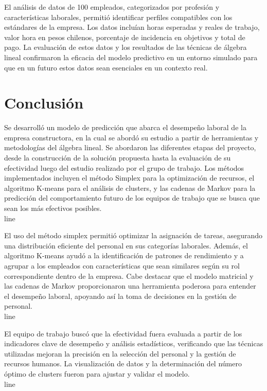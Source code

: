 \documentclass{plantillauft}
\begin{document}
El análisis de datos de 100 empleados, categorizados por profesión y características laborales, permitió identificar perfiles compatibles con los estándares de la empresa. Los datos incluían horas esperadas y reales de trabajo, valor hora en pesos chilenos, porcentaje de incidencia en objetivos y total de pago. La evaluación de estos datos y los resultados de las técnicas de álgebra lineal confirmaron la eficacia del modelo predictivo en un entorno simulado para que en un futuro estos datos sean esenciales en un contexto real.

\newpage

\section{Conclusión}
Se desarrolló un modelo de predicción que abarca el desempeño laboral de la empresa constructora, en la cual se abordó su estudio a partir de herramientas y metodologías del álgebra lineal. Se abordaron las diferentes etapas del proyecto, desde la construcción de la solución propuesta hasta la evaluación de su efectividad luego del estudio realizado por el grupo de trabajo. Los métodos implementados incluyen el método Simplex para la optimización de recursos, el algoritmo K-means para el análisis de clusters, y las cadenas de Markov para la predicción del comportamiento futuro de los equipos de trabajo que se busca que sean los más efectivos posibles.\\line

El uso del método simplex permitió optimizar la asignación de tareas, asegurando una distribución eficiente del personal en sus categorías laborales. Además, el algoritmo K-means ayudó a la identificación de patrones de rendimiento y a agrupar a los empleados con características que sean similares según su rol correspondiente dentro de la empresa. Cabe destacar que el modelo matricial y las cadenas de Markov proporcionaron una herramienta poderosa para entender el desempeño laboral, apoyando así la toma de decisiones en la gestión de personal.\\line

El equipo de trabajo buscó que la efectividad fuera evaluada a partir de los indicadores clave de desempeño y análisis estadísticos, verificando que las técnicas utilizadas mejoran la precisión en la selección del personal y la gestión de recursos humanos. La visualización de datos y la determinación del número óptimo de clusters fueron para ajustar y validar el modelo.\\line
\end{document}
